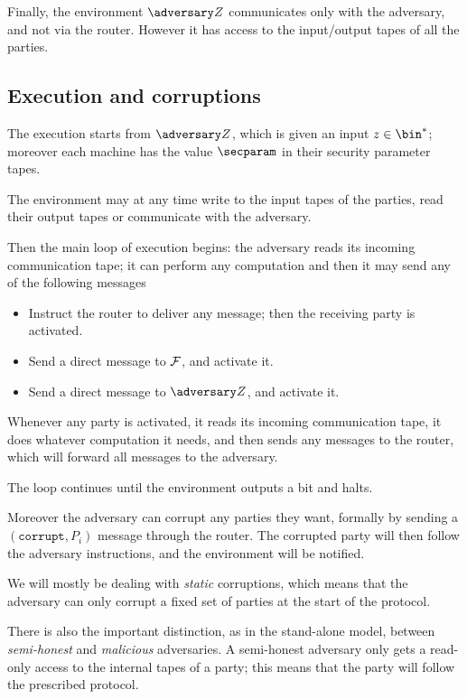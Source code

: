 Finally, the environment $\zdv$ communicates only with the adversary, and not via the router. However it has access to the input/output tapes of all the parties.

\subsection{Execution and corruptions}

The execution starts from $\zdv$, which is given an input $z\in\bin^\ast$; moreover each machine has the value $\secparam$ in their security parameter tapes.

The environment may at any time write to the input tapes of the parties, read their output tapes or communicate with the adversary.

Then the main loop of execution begins: the adversary reads its incoming communication tape; it can perform any computation and then it may send any of the following messages
\begin{itemize}
    \item Instruct the router to deliver any message; then the receiving party is activated.
    \item Send a direct message to $\mathcal{F}$, and activate it.
    \item Send a direct message to $\zdv$, and activate it.
\end{itemize}

Whenever any party is activated, it reads its incoming communication tape, it does whatever computation it needs, and then sends any messages to the router, which will forward all messages to the adversary.

The loop continues until the environment outputs a bit and halts.

Moreover the adversary can corrupt any parties they want, formally by sending a $(\texttt{corrupt}, P_i)$ message through the router. The corrupted party will then follow the adversary instructions, and the environment will be notified.

We will mostly be dealing with \emph{static} corruptions, which means that the adversary can only corrupt a fixed set of parties at the start of the protocol.

There is also the important distinction, as in the stand-alone model, between \emph{semi-honest} and \emph{malicious} adversaries. A semi-honest adversary only gets a read-only access to the internal tapes of a party; this means that the party will follow the prescribed protocol.

